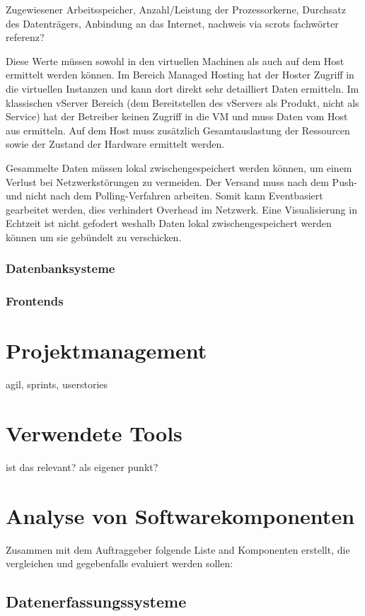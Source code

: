 Zugewiesener Arbeitsspeicher, Anzahl/Leistung der Prozessorkerne, Durchsatz des
Datenträgers, Anbindung an das Internet, nachweis via scrots fachwörter
referenz?

Diese Werte müssen sowohl in den virtuellen Machinen als auch auf dem Host
ermittelt werden können. Im Bereich Managed Hosting hat der Hoster Zugriff in
die virtuellen Instanzen und kann dort direkt sehr detailliert Daten ermitteln.
Im klassischen vServer Bereich (dem Bereitstellen des vServers als Produkt,
nicht als Service) hat der Betreiber keinen Zugriff in die VM und muss Daten
vom Host aus ermitteln. Auf dem Host muss zusätzlich Gesamtauslastung der
Ressourcen sowie der Zustand der Hardware ermittelt werden.

Gesammelte Daten müssen lokal zwischengespeichert werden können, um einem
Verlust bei Netzwerkstörungen zu vermeiden. Der Versand muss nach dem Push- und
nicht nach dem Polling-Verfahren arbeiten. Somit kann Eventbasiert gearbeitet
werden, dies verhindert Overhead im Netzwerk. Eine Visualisierung in Echtzeit
ist nicht gefodert weshalb Daten lokal zwischengespeichert werden können um sie
gebündelt zu verschicken.
\tm%

\subsubsection{Datenbanksysteme}

\subsubsection{Frontends}

\section{Projektmanagement}
agil, sprints, userstories

\section{Verwendete Tools}
ist das relevant? als eigener punkt?

\section{Analyse von Softwarekomponenten}
Zusammen mit dem Auftraggeber folgende Liste and Komponenten erstellt, die
vergleichen und gegebenfalls evaluiert werden sollen:

\subsection{Datenerfassungssysteme}

